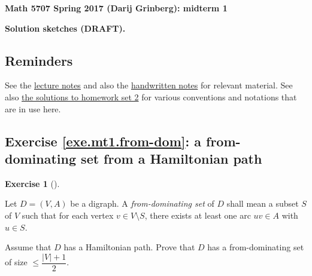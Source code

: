 \documentclass[numbers=enddot,12pt,final,onecolumn,notitlepage]{scrartcl}%
\newcounter{exer}
\theoremstyle{definition}
\newtheorem{exmp}[exer]{Exercise}
\newenvironment{exercise}[1][]
{\begin{exmp}[#1]\begin{leftbar}}
{\end{leftbar}\end{exmp}}
\newcommand{\abs}[1]{\left| #1 \right|}
\newcommand{\tup}[1]{\left( #1 \right)}
\begin{document}
\begin{center}
\textbf{Math 5707 Spring 2017 (Darij Grinberg): midterm 1}

\textbf{Solution sketches (DRAFT).}
\end{center}

\tableofcontents

\subsection{Reminders}

See the
\href{http://www-users.math.umn.edu/~dgrinber/5707s17/nogra.pdf}{lecture notes}
and also the
\href{http://www-users.math.umn.edu/~dgrinber/5707s17/}{handwritten notes}
for relevant material.
See also
\href{http://www-users.math.umn.edu/~dgrinber/5707s17/hw2s.pdf}{the solutions to homework set 2}
for various conventions and notations that are in use here.

\subsection{Exercise \ref{exe.mt1.from-dom}: a from-dominating set
from a Hamiltonian path}

\begin{exercise} \label{exe.mt1.from-dom}
Let $D = \tup{V, A}$ be a digraph. A \textit{from-dominating set} of
$D$ shall mean a subset $S$ of $V$ such that for each vertex $v \in
V \setminus S$, there exists at least one arc $uv \in A$ with
$u \in S$.

Assume that $D$ has a Hamiltonian path. Prove that $D$ has a
from-dominating set of size $\leq \dfrac{\abs{V}+1}{2}$.
\end{exercise}
\end{document}
